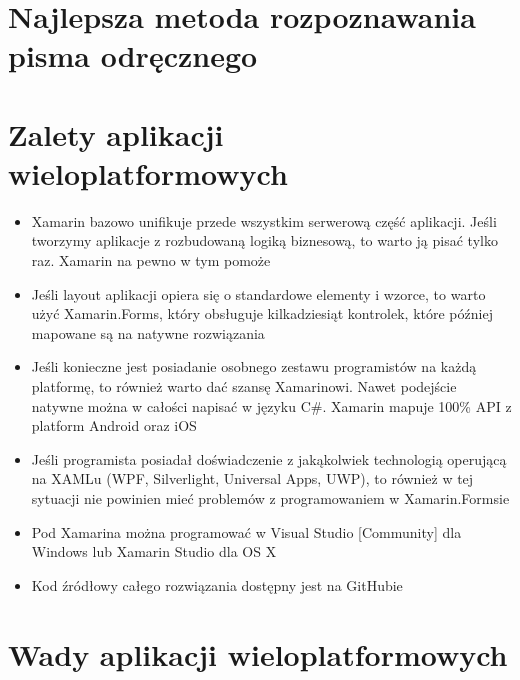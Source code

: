 \documentclass[brudnopis]{xmgr}
\begin{document}
\section{Najlepsza metoda rozpoznawania pisma odręcznego}


\section{Zalety aplikacji wieloplatformowych}

\begin{itemize}
\item
Xamarin bazowo unifikuje przede wszystkim serwerową część aplikacji. Jeśli tworzymy aplikacje z rozbudowaną logiką biznesową, to warto ją pisać tylko raz. Xamarin na pewno w tym pomoże
\item
Jeśli layout aplikacji opiera się o standardowe elementy i wzorce, to warto użyć Xamarin.Forms, który obsługuje kilkadziesiąt kontrolek, które później mapowane są na natywne rozwiązania
\item
Jeśli konieczne jest posiadanie osobnego zestawu programistów na każdą platformę, to również warto dać szansę Xamarinowi. Nawet podejście natywne można w całości napisać w języku C\#. Xamarin mapuje 100\% API z platform Android oraz iOS
\item
Jeśli programista posiadał doświadczenie z jakąkolwiek technologią operującą na XAMLu (WPF, Silverlight, Universal Apps, UWP), to również w tej sytuacji nie powinien mieć problemów z programowaniem w Xamarin.Formsie
\item
Pod Xamarina można programować w Visual Studio [Community] dla Windows lub Xamarin Studio dla OS X
\item
Kod źródłowy całego rozwiązania dostępny jest na GitHubie
\end{itemize}

\section{Wady aplikacji wieloplatformowych}
\end{document}
